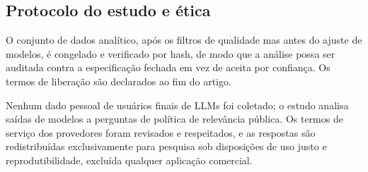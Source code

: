 \subsection{Protocolo do estudo e ética}

O conjunto de dados analítico, após os filtros de qualidade mas antes do ajuste
de modelos, é congelado e verificado por hash, de modo que a análise possa ser
auditada contra a especificação fechada em vez de aceita por confiança. Os
termos de liberação são declarados ao fim do artigo.

Nenhum dado pessoal de usuários finais de LLMs foi coletado; o estudo analisa
saídas de modelos a perguntas de política de relevância pública. Os termos de
serviço dos provedores foram revisados e respeitados, e as respostas são
redistribuídas exclusivamente para pesquisa sob disposições de uso justo e
reprodutibilidade, excluída qualquer aplicação comercial.
